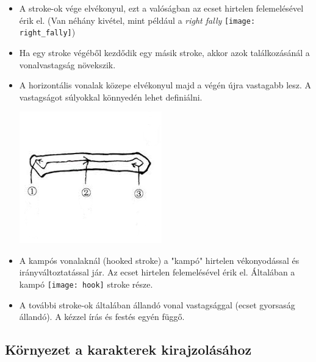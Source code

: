 \begin{itemize}
\item A stroke-ok vége elvékonyul, ezt a valóságban az ecset hirtelen felemelésével érik el. (Van néhány kivétel, mint például a \textit{right fally} \texttt{[image: right\_fally]}) 
\item Ha egy stroke végéből kezdődik egy másik stroke, akkor azok találkozásánál a vonalvastagság növekszik.
\item A horizontális vonalak közepe elvékonyul majd a végén újra vastagabb lesz. A vastagságot súlyokkal könnyedén lehet definiálni.

\begin{center}
\includegraphics[scale=0.6]{images/horizontal_line}
\end{center}

\item A kampós vonalaknál (hooked stroke) a "kampó" hirtelen vékonyodással és irányváltoztatással jár. Az ecset hirtelen felemelésével érik el. Általában a kampó \texttt{[image: hook]} stroke része.
\item A további stroke-ok általában állandó vonal vastagsággal (ecset gyorsaság állandó). A kézzel írás és festés egyén függő.
\end{itemize}

\subsection{Környezet a karakterek kirajzolásához}

